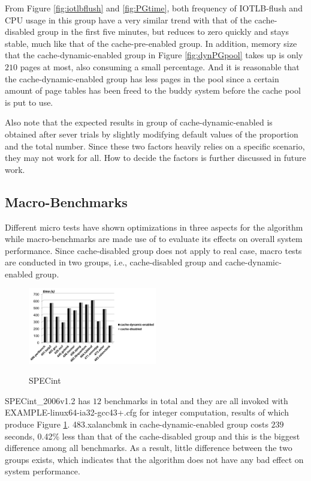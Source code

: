 From Figure \ref{fig:iotlbflush} and \ref{fig:PGtime}, both frequency of IOTLB-flush and CPU usage in this group have a very similar trend with that of the cache-disabled group in the first five minutes, but reduces to zero quickly and stays stable, much like that of the cache-pre-enabled group. In addition, memory size that the cache-dynamic-enabled group in Figure \ref{fig:dynPGpool} takes up is only $210$ pages at most, also consuming a small percentage. And it is reasonable that the cache-dynamic-enabled group has less pages in the pool since a certain amount of page tables has been freed to the buddy system before the cache pool is put to use.

Also note that the expected results in group of cache-dynamic-enabled is obtained after sever trials by slightly modifying default values of the proportion and the total number. Since these two factors heavily relies on a specific scenario, they may not work for all. How to decide the factors is further discussed in future work.

\subsection{Macro-Benchmarks}

Different micro tests have shown optimizations in three aspects for the algorithm while macro-benchmarks are made use of to evaluate its effects on overall system performance. Since cache-disabled group does not apply to real case, macro tests are conducted in two groups, i.e., cache-disabled group and cache-dynamic-enabled group.

\begin{figure}[ht]
\centering
\includegraphics[width=0.5\textwidth]{image/macro/spec.png} \\
\caption{SPECint}
\label{fig:spec}
\end{figure}

SPECint\_2006v1.2 has $12$ benchmarks in total and they are all invoked with EXAMPLE-linux64-ia32-gcc43+.cfg for integer computation, results of which produce Figure \ref{fig:spec}. 483.xalancbmk in cache-dynamic-enabled group costs $239$ seconds, 0.42\% less
than that of the cache-disabled group and this is the biggest difference among all benchmarks. As a result, little difference between the two groups exists, which indicates that the algorithm does not have any bad effect on system performance.

